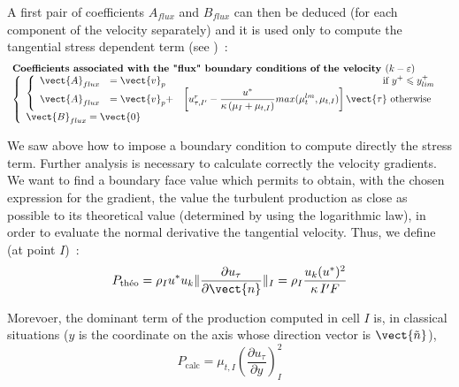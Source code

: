 A first pair of coefficients $A_{flux}$ and $B_{flux}$ can then be deduced 
(for each component of the velocity separately) and it is used only
 to compute the tangential stress dependent term  (see )~:
\begin{equation}
\begin{array}{l}
\text{\bf Coefficients associated with  the "flux" boundary conditions of the velocity } (k-\varepsilon)\\
\left\{\begin{array}{l}
\left\{\begin{array}{llr}
\vect{A}_{flux}&=\vect{v}_p& \text{ if\ } y^+\leqslant y^+_{lim} \\
\vect{A}_{flux}&=\vect{v}_p+&\left[u^r_{\tau,I'}-\displaystyle\frac{u^*}{\kappa\,
(\mu_I+\mu_{t,I})} max(\mu_{t}^{lm},\mu_{t,I}) \right]\vect{\tau} \text{ otherwise }
\end{array}\right.  \\
\vect{B}_{flux} = \vect{0}
\end{array}\right.
\end{array}
\end{equation}

We saw above how to impose a boundary condition to compute directly the stress term.
Further analysis is necessary to calculate correctly the velocity gradients. We 
want to find a boundary face value which permits to obtain, 
with the chosen expression for the gradient, 
 the value the turbulent production as close as possible to its theoretical value 
(determined by using the logarithmic law), in order to evaluate the normal 
derivative the tangential velocity. 
Thus, we define (at point $I$)~:
\begin{equation}\label{Base_Clptur_eq_ptheo_clptur}
P_{\text{th\'eo}} = \rho_I u^* u_k
\|\displaystyle\frac{\partial u_\tau}{\partial\vect{n}}\|_{I} =
\rho_I \displaystyle\frac{u_k(u^*)^2}{\kappa\, I'F}
\end{equation}

Morevoer, the dominant term of the production computed in cell $I$ is,
in classical situations ($y$ is the coordinate on the axis 
whose direction vector is $\vect{\tilde{n}}$),
\begin{equation}
P_{\text{calc}} =
\mu_{t,I}\left(\displaystyle\frac{\partial u_\tau}{\partial y}\right)^2_{I}
\end{equation}

